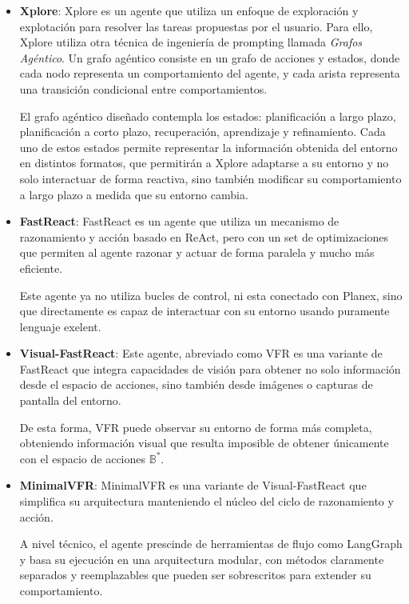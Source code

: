 \begin{itemize}
    \item \textbf{Xplore}: Xplore es un agente que utiliza un enfoque de exploración
    y explotación para resolver las tareas propuestas por el usuario. Para ello, Xplore
    utiliza otra técnica de ingeniería de prompting llamada \emph{Grafos Agéntico}. Un
    grafo agéntico consiste en un grafo de acciones y estados, donde cada nodo
    representa un comportamiento del agente, y cada arista representa una transición
    condicional entre comportamientos.

    El grafo agéntico diseñado contempla los estados: planificación a largo plazo,
    planificación a corto plazo, recuperación, aprendizaje y refinamiento. Cada
    uno de estos estados permite representar la información obtenida del entorno en
    distintos formatos, que permitirán a Xplore adaptarse a su entorno y no solo interactuar
    de forma reactiva, sino también modificar su comportamiento a largo plazo a medida
    que su entorno cambia.

    \item \textbf{FastReact}: FastReact es un agente que utiliza un mecanismo
    de razonamiento y acción basado en ReAct, pero con un set de optimizaciones
    que permiten al agente razonar y actuar de forma paralela y mucho más eficiente.

    Este agente ya no utiliza bucles de control, ni esta conectado con Planex,
    sino que directamente es capaz de interactuar con su entorno usando puramente
    lenguaje exelent.

    \item \textbf{Visual-FastReact}: Este agente, abreviado como VFR es una variante
    de FastReact que integra capacidades de visión para obtener no solo información
    desde el espacio de acciones, sino también desde imágenes o capturas de pantalla 
    del entorno.

    De esta forma, VFR puede observar su entorno de forma más completa,
    obteniendo información visual que resulta imposible de obtener
    únicamente con el espacio de acciones \(\mathbb{B}^*\).

    \item \textbf{MinimalVFR}: MinimalVFR es una variante de Visual-FastReact
    que simplifica su arquitectura manteniendo el núcleo del ciclo de
    razonamiento y acción.
    
    A nivel técnico, el agente prescinde de herramientas de flujo como LangGraph
    y basa su ejecución en una arquitectura modular, con métodos claramente
    separados y reemplazables que pueden ser sobrescritos para extender su comportamiento.


\end{itemize}
